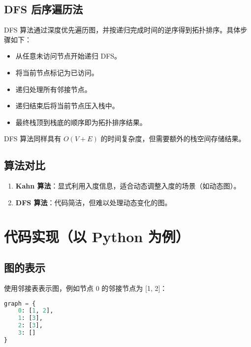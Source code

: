 \section{DFS 后序遍历法}
DFS 算法通过深度优先遍历图，并按递归完成时间的逆序得到拓扑排序。具体步骤如下：\par
\begin{itemize}
\item 从任意未访问节点开始递归 DFS。
\item 将当前节点标记为已访问。
\item 递归处理所有邻接节点。
\item 递归结束后将当前节点压入栈中。
\item 最终栈顶到栈底的顺序即为拓扑排序结果。
\end{itemize}
DFS 算法同样具有 $O(V + E)$ 的时间复杂度，但需要额外的栈空间存储结果。\par
\section{算法对比}
\begin{enumerate}
\item \textbf{Kahn 算法}：显式利用入度信息，适合动态调整入度的场景（如动态图）。
\item \textbf{DFS 算法}：代码简洁，但难以处理动态变化的图。
\end{enumerate}
\chapter{代码实现（以 Python 为例）}
\section{图的表示}
使用邻接表表示图，例如节点 0 的邻接节点为 [1, 2]：\par
\begin{lstlisting}[language=python]
graph = {
    0: [1, 2],
    1: [3],
    2: [3],
    3: []
}
\end{lstlisting}
